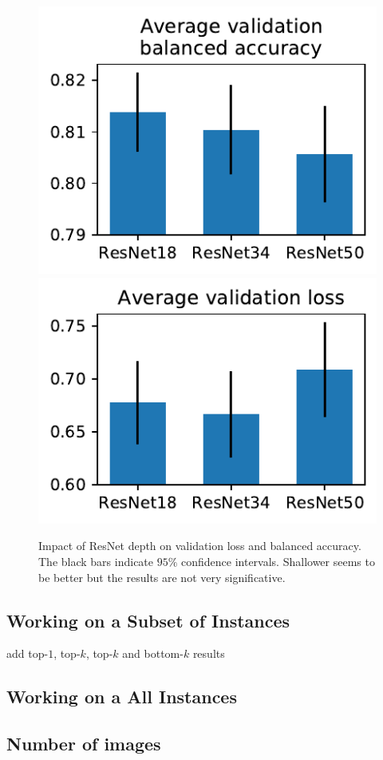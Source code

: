 \documentclass[final]{cvpr}
\begin{document}
	\begin{figure}[h]
		\begin{center}
			\includegraphics[width=0.47\linewidth]{fig/resnets_bal_acc.pdf}
			\includegraphics[width=0.47\linewidth]{fig/resnets_val_loss.pdf}
		\end{center}
		\caption{Impact of ResNet depth on validation loss and balanced accuracy. The black bars indicate $95\%$ confidence intervals. Shallower seems to be better but the results are not very significative.}
		\label{fig:resnet}
	\end{figure}
	
	\subsection{Working on a Subset of Instances}
	
	add top-$1$, top-$k$, top-$k$ and bottom-$k$ results
	
	\subsection{Working on a All Instances}
	
	\subsection{Number of images}
	
\end{document}
